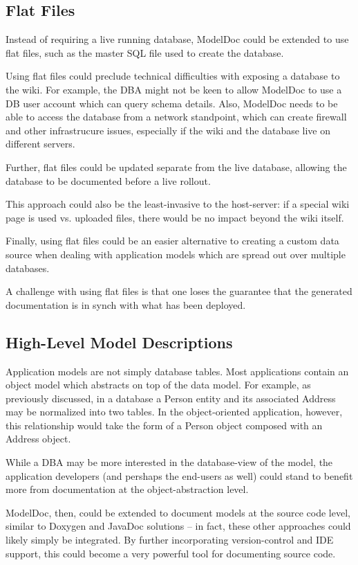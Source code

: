 \documentclass[twocolumn]{article}
\begin{document}
\subsection{Flat Files}

Instead of requiring a live running database, ModelDoc could be extended to use
flat files, such as the master SQL file used to create the database.

Using flat files could preclude technical difficulties with exposing a database
to the wiki.  For example, the DBA might not be keen to allow ModelDoc to use a
DB user account which can query schema details.  Also, ModelDoc needs to be
able to access the database from a network standpoint, which can create
firewall and other infrastrucure issues, especially if the wiki and the
database live on different servers.

Further, flat files could be updated separate from the live database, allowing
the database to be documented before a live rollout.

This approach could also be the least-invasive to the host-server: if a special
wiki page is used vs. uploaded files, there would be no impact beyond the
wiki itself.

Finally, using flat files could be an easier alternative to creating a custom
data source when dealing with application models which are spread out over
multiple databases.

A challenge with using flat files is that one loses the guarantee that the
generated documentation is in synch with what has been deployed.

\subsection{High-Level Model Descriptions}

Application models are not simply database tables.  Most applications contain
an object model which abstracts on top of the data model.  For example, as
previously discussed, in a database a Person entity and its associated Address
may be normalized into two tables.  In the object-oriented application,
however, this relationship would take the form of a Person object composed with
an Address object.

While a DBA may be more interested in the database-view of the model, the
application developers (and pershaps the end-users as well) could stand to
benefit more from documentation at the object-abstraction level.

ModelDoc, then, could be extended to document models at the source code level,
similar to Doxygen and JavaDoc solutions -- in fact, these other approaches
could likely simply be integrated.  By further incorporating version-control
and IDE support, this could become a very powerful tool for documenting source
code.
\end{document}
